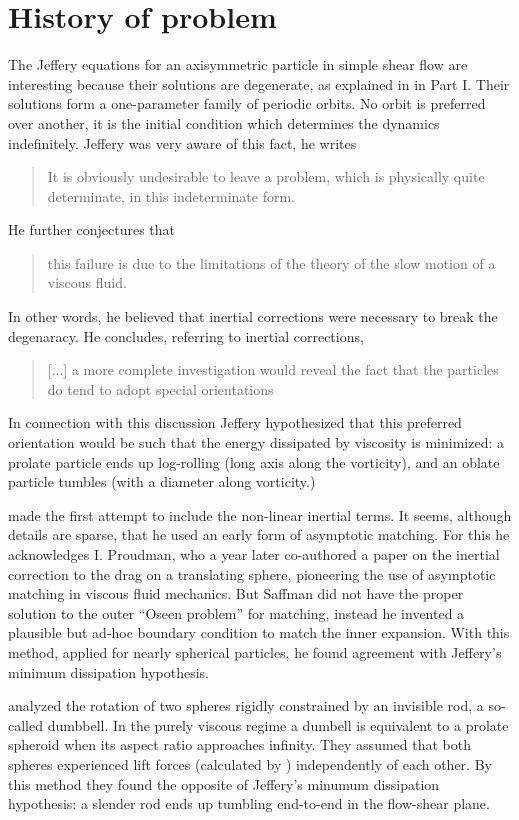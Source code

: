 \documentclass[thesis.tex]{subfiles}
\begin{document}
\section{History of problem}

The Jeffery equations for an axisymmetric particle in simple shear flow are interesting because their solutions are degenerate, as explained in  in Part I. Their solutions form a one-parameter family of periodic orbits. No orbit is preferred over another, it is the initial condition which determines the dynamics indefinitely. Jeffery was very aware of this fact, he writes \blockquote{It is obviously undesirable to leave a problem, which is physically quite determinate, in this indeterminate form.}
He further conjectures that \blockquote{this failure is due to the limitations of the theory of the slow motion of a viscous fluid.}
In other words, he believed that inertial corrections were necessary to break the degenaracy. He concludes, referring to inertial corrections, \blockquote[][...]{[...] a more complete investigation would reveal the fact that the particles do tend to adopt special orientations} 
In connection with this discussion Jeffery hypothesized that this preferred orientation would be such that the energy dissipated by viscosity is minimized: a prolate particle ends up log-rolling (long axis along the vorticity), and an oblate particle tumbles (with a diameter along vorticity.)

\citet{saffman1956} made the first attempt to include the non-linear inertial terms. It seems, although details are sparse, that he used an early form of asymptotic matching. For this he acknowledges I. Proudman, who a year later co-authored a paper \cite{proudman1957} on the inertial correction to the drag on a translating sphere, pioneering the use of asymptotic matching in viscous fluid mechanics. But Saffman did not have the proper solution to the outer ``Oseen problem'' for matching, instead he invented a plausible but ad-hoc boundary condition to match the inner expansion. With this method, applied for nearly spherical particles, he found agreement with Jeffery's minimum dissipation hypothesis.

\citet{harper1968} analyzed the rotation of two spheres rigidly constrained by an invisible rod, a so-called dumbbell. In the purely viscous regime a dumbell is equivalent to a prolate spheroid when its aspect ratio approaches infinity. They assumed that both spheres experienced lift forces (calculated by \citet{saffman1965}) independently of each other. By this method they found the opposite of Jeffery's minumum dissipation hypothesis: a slender rod ends up tumbling end-to-end in the flow-shear plane.
\end{document}
